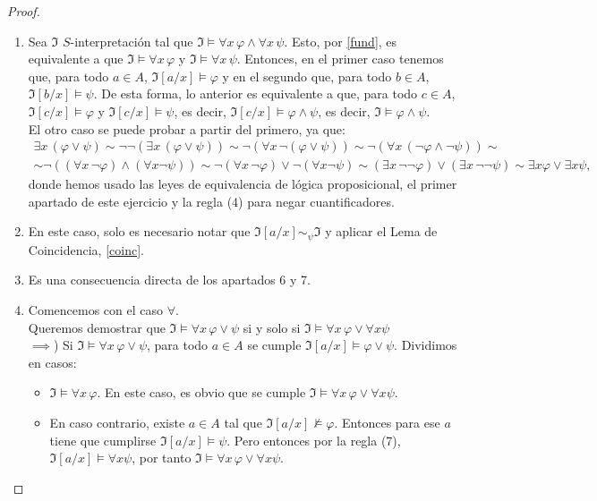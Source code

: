 \begin{proof}
\begin{enumerate}
    \item Sea $\mathfrak{I}$ $S$-interpretación tal que $\mathfrak{I} \vDash \forall x \, \varphi \land \forall x \, \psi$. Esto, por \ref{fund}, es equivalente a que $\mathfrak{I} \vDash \forall x \, \varphi $ y $\mathfrak{I} \vDash \forall x \, \psi$. Entonces, en el primer caso tenemos que, para todo $a \in A$, $\mathfrak{I}[a/x] \vDash \varphi$ y en el segundo que, para todo $b \in A$, $\mathfrak{I}[b/x] \vDash \psi$. De esta forma, lo anterior es equivalente a que, para todo $c \in A$, $\mathfrak{I}[c/x] \vDash \varphi$ y $\mathfrak{I}[c/x] \vDash \psi$, es decir, $\mathfrak{I}[c/x] \vDash \varphi \land \psi$, es decir, $\mathfrak{I} \vDash \varphi \land \psi$.\\
    El otro caso se puede probar a partir del primero, ya que:
    \begin{multline*}
        \exists x \, (\varphi \lor \psi) \sim \neg\neg(\exists x \, (\varphi \lor \psi))\sim\neg(\forall x\,\neg(\varphi\lor\psi))\sim\neg(\forall x\,(\neg\varphi\land\neg\psi))\sim \\ \sim\neg((\forall x\,\neg\varphi)\land(\forall x\neg\psi))\sim\neg(\forall x\,\neg\varphi)\lor\neg(\forall x\neg\psi)\sim(\exists x\,\neg\neg\varphi)\lor(\exists x\,\neg\neg\psi)\sim\exists x\varphi\lor\exists x\psi,
    \end{multline*}
    donde hemos usado las leyes de equivalencia de lógica proposicional, el primer apartado de este ejercicio y la regla (4) para negar cuantificadores.
    \item En este caso, solo es necesario notar que $\mathfrak{I}[a/x] \sim_{\psi} \mathfrak{I}$ y aplicar el Lema de Coincidencia, \ref{coinc}.
    \item Es una consecuencia directa de los apartados 6 y 7.
    \item Comencemos con el caso $\forall$.\\ 
    Queremos demostrar que $\mathfrak{I}\vDash\forall x\,\varphi\lor\psi$ si y solo si $\mathfrak{I}\vDash\forall x\,\varphi\lor\forall x\psi$\\
    $\implies$) Si $\mathfrak{I}\vDash\forall x\,\varphi\lor\psi$, para todo $a\in A$ se cumple $\mathfrak{I}[a/x]\vDash\varphi\lor\psi$. Dividimos en casos:
    \begin{itemize}
        \item $\mathfrak{I}\vDash\forall x\,\varphi$. En este caso, es obvio que se cumple $\mathfrak{I}\vDash\forall x\,\varphi\lor\forall x\psi$.
        \item En caso contrario, existe $a\in A$ tal que $\mathfrak{I}[a/x]\nvDash\varphi$. Entonces para ese $a$ tiene que cumplirse $\mathfrak{I}[a/x]\vDash\psi$. Pero entonces por la regla (7), $\mathfrak{I}[a/x]\vDash\forall x\psi$, por tanto $\mathfrak{I}\vDash\forall x\,\varphi\lor\forall x\psi$.

\end{itemize}
\end{enumerate}
\end{proof}
